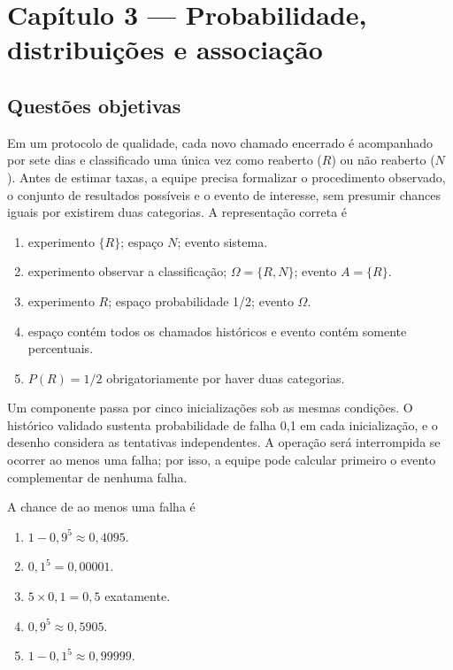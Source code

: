 \section{Capítulo 3 --- Probabilidade, distribuições e associação}
\subsection{Questões objetivas}
\TextoBase Em um protocolo de qualidade, cada novo chamado encerrado é acompanhado por sete dias e classificado uma única vez como reaberto ($R$) ou não reaberto ($N$). Antes de estimar taxas, a equipe precisa formalizar o procedimento observado, o conjunto de resultados possíveis e o evento de interesse, sem presumir chances iguais por existirem duas categorias.
\FonteDidatica
\Comando A representação correta é
\begin{enumerate}[label=\Alph*)]\item experimento $\{R\}$; espaço $N$; evento sistema.\item experimento observar a classificação; $\Omega=\{R,N\}$; evento $A=\{R\}$.\item experimento $R$; espaço probabilidade 1/2; evento $\Omega$.\item espaço contém todos os chamados históricos e evento contém somente percentuais.\item $P(R)=1/2$ obrigatoriamente por haver duas categorias.\end{enumerate}

\TextoBase Um componente passa por cinco inicializações sob as mesmas condições. O histórico validado sustenta probabilidade de falha 0,1 em cada inicialização, e o desenho considera as tentativas independentes. A operação será interrompida se ocorrer ao menos uma falha; por isso, a equipe pode calcular primeiro o evento complementar de nenhuma falha.
\begin{center}
\end{center}
\FonteDidatica
\Comando A chance de ao menos uma falha é
\begin{enumerate}[label=\Alph*)]\item $1-0{,}9^5\approx0{,}4095$.\item $0{,}1^5=0{,}00001$.\item $5\times0{,}1=0{,}5$ exatamente.\item $0{,}9^5\approx0{,}5905$.\item $1-0{,}1^5\approx0{,}99999$.\end{enumerate}

